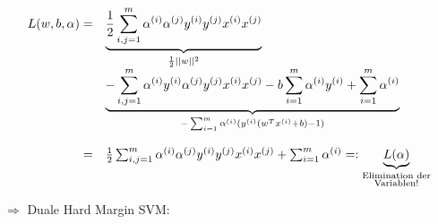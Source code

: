 			\begin{equation*}
				\begin{array}{rl}
				L(w,b,\alpha) = & \underset{\frac{1}{2} ||w||^2}{\underbrace{\frac{1}{2} \sum_{i,j = 1}^{m} \alpha^{(i)} \alpha^{(j)} y^{(i)} y^{(j)} x^{(i)} x^{(j)}}}\\
				& \underset{-\sum_{i = 1}^{m} \alpha^{(i)} (y^{(i)}(w^T x^{(i)} + b)-1)}{\underbrace{- \sum_{i,j = 1}^{m} \alpha^{(i)} y^{(i)} \alpha^{(j)} y^{(j)} x^{(i)} x^{(j)}
						- b \sum_{i = 1}^{m} \alpha^{(i)} y^{(i)} + \sum_{i = 1}^{m} \alpha^{(i)}}}\\
				&\\
				= & \frac{1}{2} \sum_{i,j = 1}^{m} \alpha^{(i)} \alpha^{(j)} y^{(i)} y^{(j)} x^{(i)} x^{(j)} + \sum_{i = 1}^{m} \alpha^{(i)} =: \underset{\substack{\text{Elimination der} \\ \text{Variablen!}}}{\underbrace{L(\alpha)}}
				\end{array}
			\end{equation*}	
			
			$ \Rightarrow $ Duale Hard Margin SVM:
			\begin{center}
			\end{center}
		
		

\egroup
